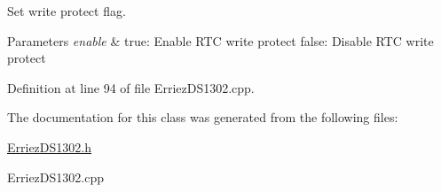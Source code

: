 Set write protect flag. 


\begin{DoxyParams}{Parameters}
{\em enable} & true\+: Enable R\+TC write protect false\+: Disable R\+TC write protect \\
\hline
\end{DoxyParams}


Definition at line 94 of file Erriez\+D\+S1302.\+cpp.



The documentation for this class was generated from the following files\+:\begin{DoxyCompactItemize}
\item 
\hyperlink{_erriez_d_s1302_8h}{Erriez\+D\+S1302.\+h}\item 
Erriez\+D\+S1302.\+cpp\end{DoxyCompactItemize}
